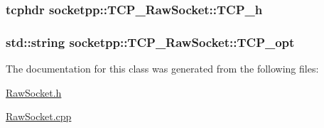 \hypertarget{classsocketpp_1_1TCP__RawSocket_d1980411bd147dd67f6d9d9578414c17}{
\subsubsection[{TCP\_\-h}]{\setlength{\rightskip}{0pt plus 5cm}tcphdr {\bf socketpp::TCP\_\-RawSocket::TCP\_\-h}}}
\label{classsocketpp_1_1TCP__RawSocket_d1980411bd147dd67f6d9d9578414c17}


\hypertarget{classsocketpp_1_1TCP__RawSocket_380529364d9488faf998543d433d8fe6}{
\subsubsection[{TCP\_\-opt}]{\setlength{\rightskip}{0pt plus 5cm}std::string {\bf socketpp::TCP\_\-RawSocket::TCP\_\-opt}}}
\label{classsocketpp_1_1TCP__RawSocket_380529364d9488faf998543d433d8fe6}




The documentation for this class was generated from the following files:\begin{CompactItemize}
\item 
\hyperlink{RawSocket_8h}{RawSocket.h}\item 
\hyperlink{RawSocket_8cpp}{RawSocket.cpp}\end{CompactItemize}

